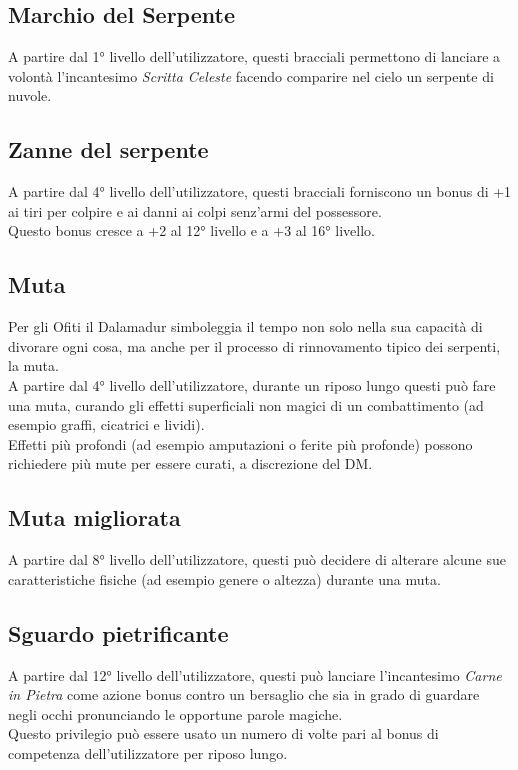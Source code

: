 \documentclass[letterpaper,twocolumn,openany,nodeprecatedcode]{dndbook}
\begin{document}
\subsection{Marchio del Serpente}
A partire dal 1° livello dell'utilizzatore, questi bracciali permettono di lanciare a volontà l'incantesimo \textit{Scritta Celeste} facendo comparire nel cielo un serpente di nuvole.

\subsection{Zanne del serpente}
A partire dal 4° livello dell'utilizzatore, questi bracciali forniscono un bonus di +1 ai tiri per colpire e ai danni ai colpi senz'armi del possessore.\\
Questo bonus cresce a +2 al 12° livello e a +3 al 16° livello.

\subsection{Muta}
Per gli Ofiti il Dalamadur simboleggia il tempo non solo nella sua capacità di divorare ogni cosa, ma anche per il processo di rinnovamento tipico dei serpenti, la muta.\\
A partire dal 4° livello dell'utilizzatore, durante un riposo lungo questi può fare una muta, curando gli effetti superficiali non magici di un combattimento (ad esempio graffi, cicatrici e lividi).\\
Effetti più profondi (ad esempio amputazioni o ferite più profonde) possono richiedere più mute per essere curati, a discrezione del DM.

\subsection{Muta migliorata}
A partire dal 8° livello dell'utilizzatore, questi può decidere di alterare alcune sue caratteristiche fisiche (ad esempio genere o altezza) durante una muta.

\subsection{Sguardo pietrificante}
A partire dal 12° livello dell'utilizzatore, questi può lanciare l'incantesimo \textit{Carne in Pietra} come azione bonus contro un bersaglio che sia in grado di guardare negli occhi pronunciando le opportune parole magiche.\\
Questo privilegio può essere usato un numero di volte pari al bonus di competenza dell'utilizzatore per riposo lungo.
\end{document}
